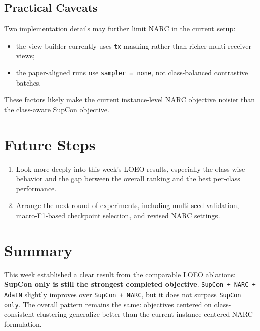 \documentclass[11pt]{article}
\begin{document}
\subsection{Practical Caveats}
Two implementation details may further limit NARC in the current setup:
\begin{itemize}
    \item the view builder currently uses \texttt{tx} masking rather than richer multi-receiver views;
    \item the paper-aligned runs use \texttt{sampler = none}, not class-balanced contrastive batches.
\end{itemize}
These factors likely make the current instance-level NARC objective noisier than the class-aware SupCon objective.

\section{Future Steps}

\begin{enumerate}
    \item Look more deeply into this week's LOEO results, especially the class-wise behavior and the gap between the overall ranking and the best per-class performance.
    \item Arrange the next round of experiments, including multi-seed validation, macro-F1-based checkpoint selection, and revised NARC settings.
\end{enumerate}

\section{Summary}
This week established a clear result from the comparable LOEO ablations: \textbf{SupCon only is still the strongest completed objective}. \texttt{SupCon + NARC + AdaIN} slightly improves over \texttt{SupCon + NARC}, but it does not surpass \texttt{SupCon only}. The overall pattern remains the same: objectives centered on class-consistent clustering generalize better than the current instance-centered NARC formulation.
\end{document}
